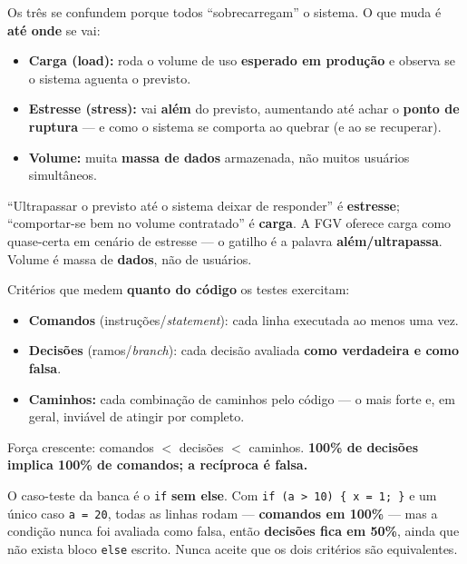 \begin{conceito}
Os três se confundem porque todos ``sobrecarregam'' o sistema. O que muda é
\textbf{até onde} se vai:

\begin{itemize}
\item \textbf{Carga (load):} roda o volume de uso \textbf{esperado em
produção} e observa se o sistema aguenta o previsto.
\item \textbf{Estresse (stress):} vai \textbf{além} do previsto, aumentando
até achar o \textbf{ponto de ruptura} --- e como o sistema se comporta ao
quebrar (e ao se recuperar).
\item \textbf{Volume:} muita \textbf{massa de dados} armazenada, não muitos
usuários simultâneos.
\end{itemize}
\end{conceito}

\begin{pegadinha}
``Ultrapassar o previsto até o sistema deixar de responder'' é
\textbf{estresse}; ``comportar-se bem no volume contratado'' é \textbf{carga}.
A FGV oferece carga como quase-certa em cenário de estresse --- o gatilho é a
palavra \textbf{além/ultrapassa}. Volume é massa de \textbf{dados}, não de
usuários.
\end{pegadinha}

\begin{conceito}
Critérios que medem \textbf{quanto do código} os testes exercitam:

\begin{itemize}
\item \textbf{Comandos} (instruções/\emph{statement}): cada linha executada
ao menos uma vez.
\item \textbf{Decisões} (ramos/\emph{branch}): cada decisão avaliada
\textbf{como verdadeira e como falsa}.
\item \textbf{Caminhos:} cada combinação de caminhos pelo código --- o mais
forte e, em geral, inviável de atingir por completo.
\end{itemize}

Força crescente: comandos $<$ decisões $<$ caminhos. \textbf{100\% de decisões
implica 100\% de comandos; a recíproca é falsa.}
\end{conceito}

\begin{pegadinha}
O caso-teste da banca é o \texttt{if} \textbf{sem else}. Com
\texttt{if (a > 10) \{ x = 1; \}} e um único caso \texttt{a = 20}, todas as
linhas rodam --- \textbf{comandos em 100\%} --- mas a condição nunca foi
avaliada como falsa, então \textbf{decisões fica em 50\%}, ainda que não
exista bloco \texttt{else} escrito. Nunca aceite que os dois critérios são
equivalentes.
\end{pegadinha}

